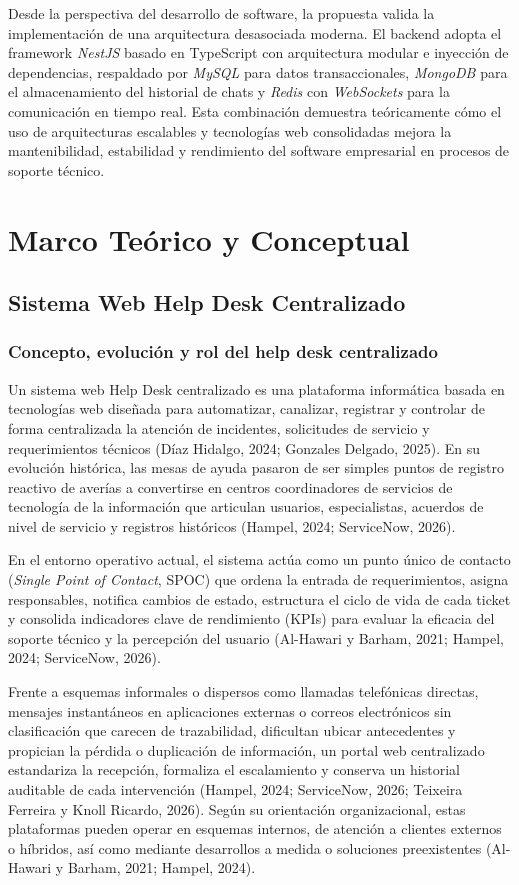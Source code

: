 Desde la perspectiva del desarrollo de software, la propuesta valida la implementación de una arquitectura desasociada moderna. El backend adopta el framework \textit{NestJS} basado en TypeScript con arquitectura modular e inyección de dependencias, respaldado por \textit{MySQL} para datos transaccionales, \textit{MongoDB} para el almacenamiento del historial de chats y \textit{Redis} con \textit{WebSockets} para la comunicación en tiempo real. Esta combinación demuestra teóricamente cómo el uso de arquitecturas escalables y tecnologías web consolidadas mejora la mantenibilidad, estabilidad y rendimiento del software empresarial en procesos de soporte técnico.

\section{Marco Teórico y Conceptual}

\subsection{Sistema Web Help Desk Centralizado}

\subsubsection{Concepto, evolución y rol del help desk centralizado}
Un sistema web Help Desk centralizado es una plataforma informática basada en tecnologías web diseñada para automatizar, canalizar, registrar y controlar de forma centralizada la atención de incidentes, solicitudes de servicio y requerimientos técnicos (Díaz Hidalgo, 2024; Gonzales Delgado, 2025). En su evolución histórica, las mesas de ayuda pasaron de ser simples puntos de registro reactivo de averías a convertirse en centros coordinadores de servicios de tecnología de la información que articulan usuarios, especialistas, acuerdos de nivel de servicio y registros históricos (Hampel, 2024; ServiceNow, 2026).

En el entorno operativo actual, el sistema actúa como un punto único de contacto (\textit{Single Point of Contact}, SPOC) que ordena la entrada de requerimientos, asigna responsables, notifica cambios de estado, estructura el ciclo de vida de cada ticket y consolida indicadores clave de rendimiento (KPIs) para evaluar la eficacia del soporte técnico y la percepción del usuario (Al-Hawari y Barham, 2021; Hampel, 2024; ServiceNow, 2026).

Frente a esquemas informales o dispersos como llamadas telefónicas directas, mensajes instantáneos en aplicaciones externas o correos electrónicos sin clasificación que carecen de trazabilidad, dificultan ubicar antecedentes y propician la pérdida o duplicación de información, un portal web centralizado estandariza la recepción, formaliza el escalamiento y conserva un historial auditable de cada intervención (Hampel, 2024; ServiceNow, 2026; Teixeira Ferreira y Knoll Ricardo, 2026). Según su orientación organizacional, estas plataformas pueden operar en esquemas internos, de atención a clientes externos o híbridos, así como mediante desarrollos a medida o soluciones preexistentes (Al-Hawari y Barham, 2021; Hampel, 2024).

